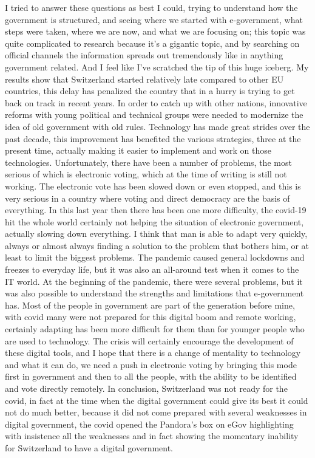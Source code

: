 I tried to answer these questions as best I could, trying to understand how the government is structured, and seeing where we started with e-government, what steps were taken, where we are now, and what we are focusing on; this topic was quite complicated to research because it's a gigantic topic, and by searching on official channels the information spreads out tremendously like in anything government related. And I feel like I've scratched the tip of this huge iceberg.
My results show that Switzerland started relatively late compared to other EU countries, this delay has penalized the country that in a hurry is trying to get back on track in recent years.
In order to catch up with other nations, innovative reforms with young political and technical groups were needed to modernize the idea of old government with old rules.
Technology has made great strides over the past decade, this improvement has benefited the various strategies, three at the present time, actually making it easier to implement and work on those technologies.
Unfortunately, there have been a number of problems, the most serious of which is electronic voting, which at the time of writing is still not working. The electronic vote has been slowed down or even stopped, and this is very serious in a country where voting and direct democracy are the basis of everything.
In this last year then there has been one more difficulty, the covid-19 hit the whole world certainly not helping the situation of electronic government, actually slowing down everything.
I think that man is able to adapt very quickly, always or almost always finding a solution to the problem that bothers him, or at least to limit the biggest problems.
The pandemic caused general lockdowns and freezes to everyday life, but it was also an all-around test when it comes to the IT world. At the beginning of the pandemic, there were several problems, but it was also possible to understand the strengths and limitations that e-government has. Most of the people in government are part of the generation before mine, with covid many were not prepared for this digital boom and remote working, certainly adapting has been more difficult for them than for younger people who are used to technology.
The crisis will certainly encourage the development of these digital tools, and I hope that there is a change of mentality to technology and what it can do, we need a push in electronic voting by bringing this mode first in government and then to all the people, with the ability to be identified and vote directly remotely.
In conclusion, Switzerland was not ready for the covid, in fact at the time when the digital government could give its best it could not do much better, because it did not come prepared with several weaknesses in digital government, the covid opened the Pandora's box on eGov highlighting with insistence all the weaknesses and in fact showing the momentary inability for Switzerland to have a digital government.
